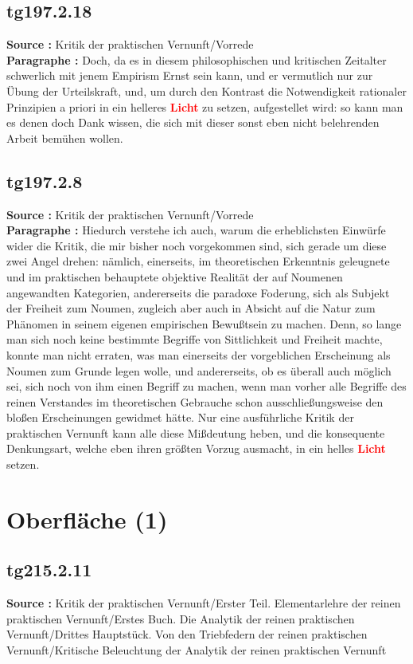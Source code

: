 \documentclass[a4paper,12pt,twoside]{book}
\newcommand{\match}[1]{\textcolor{red}{\textbf{#1}}}
\newcommand{\unnumberedsection}[1]{
	\section*{#1}
	\addcontentsline{toc}{section}{#1}
	\markright{#1}
}
\begin{document}
	\subsection*{tg197.2.18} 
	\textbf{Source : }Kritik der praktischen Vernunft/Vorrede\\  
	
	\textbf{Paragraphe : }Doch, da es in diesem philosophischen und kritischen Zeitalter schwerlich mit jenem Empirism Ernst sein kann, und er vermutlich nur zur Übung der Urteilskraft, und, um durch den Kontrast die Notwendigkeit rationaler Prinzipien a priori in ein helleres \match{Licht} zu setzen, aufgestellet wird: so kann man es denen doch Dank wissen, die sich mit dieser sonst eben nicht belehrenden Arbeit bemühen wollen. 
	
	\subsection*{tg197.2.8} 
	\textbf{Source : }Kritik der praktischen Vernunft/Vorrede\\  
	
	\textbf{Paragraphe : }
	Hiedurch verstehe ich auch, warum die erheblichsten Einwürfe wider die Kritik, die mir bisher noch vorgekommen sind, sich gerade um diese zwei Angel drehen: nämlich, einerseits, im theoretischen Erkenntnis geleugnete und im praktischen behauptete objektive Realität der auf Noumenen angewandten Kategorien, andererseits die paradoxe Foderung, sich als Subjekt der Freiheit zum Noumen, zugleich aber auch in Absicht auf die Natur zum Phänomen in seinem eigenen empirischen Bewußtsein zu machen. Denn, so lange man sich noch keine bestimmte Begriffe von Sittlichkeit und Freiheit machte, konnte man nicht erraten, was man einerseits der vorgeblichen Erscheinung als Noumen zum Grunde legen wolle, und andererseits, ob es überall auch möglich sei, sich noch von ihm einen Begriff zu machen, wenn man vorher alle Begriffe des reinen Verstandes im theoretischen Gebrauche schon ausschließungsweise den bloßen Erscheinungen gewidmet hätte. Nur eine ausführliche Kritik der praktischen Vernunft kann alle diese Mißdeutung heben, und die konsequente Denkungsart, welche eben ihren größten Vorzug ausmacht, in ein helles \match{Licht} setzen. 
	
	\unnumberedsection{Oberfläche (1)} 
	\subsection*{tg215.2.11} 
	\textbf{Source : }Kritik der praktischen Vernunft/Erster Teil. Elementarlehre der reinen praktischen Vernunft/Erstes Buch. Die Analytik der reinen praktischen Vernunft/Drittes Hauptstück. Von den Triebfedern der reinen praktischen Vernunft/Kritische Beleuchtung der Analytik der reinen praktischen Vernunft\\  
	
\end{document}
